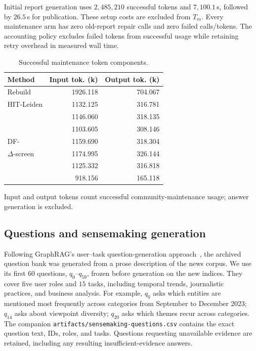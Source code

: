  Initial report
generation uses $2{,}485{,}210$ successful tokens and $7{,}100.1$\,s, followed
by $26.5$\,s for publication. These setup costs are excluded from $T_m$.
Every maintenance arm has zero old-report repair calls and zero failed
calls/tokens. The accounting policy excludes failed tokens from successful
usage while retaining retry overhead in measured wall time.

\begin{table}[tb]\centering
\caption{Successful maintenance token components.}
\label{tab:case-study-tokens}
\footnotesize
\setlength{\tabcolsep}{0.25em}
\begin{tabular*}{\linewidth}{@{\extracolsep{\fill}}lrr@{}}
\toprule
Method & Input tok. (k) & Output tok. (k) \\
\midrule
Rebuild & 1926.118 & 704.067 \\
HIT-Leiden & 1132.125 & 316.781 \\
\DynaMo{} & 1146.060 & 318.135 \\
\QCA{} & 1103.605 & 308.146 \\
DF-\Louvain{} & 1159.690 & 318.304 \\
$\Delta$-screen & 1174.995 & 326.144 \\
\Batch{} & 1125.332 & 316.818 \\
\DyLo{} & 918.156 & 165.118 \\
\bottomrule
\end{tabular*}
\par\smallskip\raggedright
Input and output tokens count successful community-maintenance usage; answer generation is excluded.
\end{table}

\subsection{Questions and sensemaking generation}\label{app:questions}

Following GraphRAG's user--task question-generation approach~\cite{edge2024graphrag},
the archived question bank was generated from a prose description of the
news corpus. We use its first $60$ questions, $q_0$--$q_{59}$, frozen before
generation on the new indices. They cover five user roles and $15$ tasks,
including temporal trends, journalistic practices, and business analysis.
For example, $q_0$ asks which entities are mentioned most frequently across
categories from September to December 2023; $q_{14}$ asks about viewpoint
diversity; $q_{20}$ asks which themes recur across categories.
The companion \texttt{artifacts/sensemaking-questions.csv} contains the exact
question text, IDs, roles, and tasks. Questions requesting unavailable
evidence are retained, including any resulting insufficient-evidence answers.

